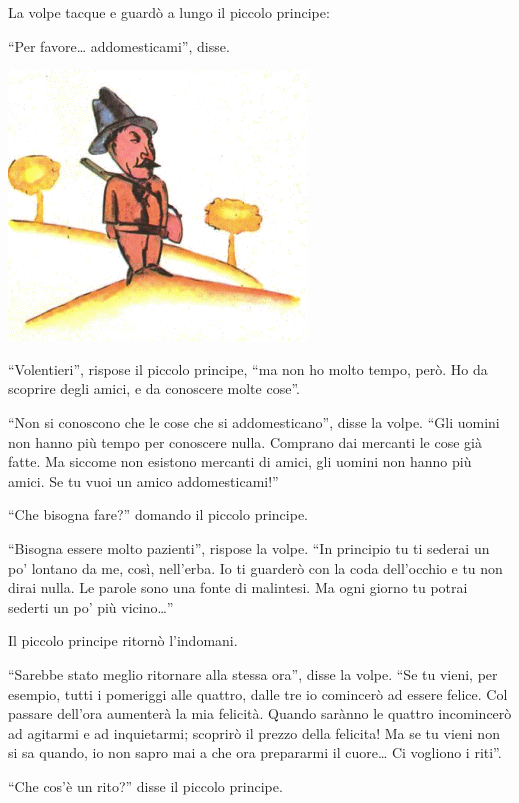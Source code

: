 \documentclass[11pt]{scrbook}
\begin{document}
La volpe tacque e guardò a lungo il piccolo principe:

``Per favore\ldots{} addomesticami'', disse.

\begin{center}
\includegraphics{img/myslivec}
\end{center}

``Volentieri'', rispose il piccolo principe, ``ma non ho molto tempo, però. Ho da scoprire degli amici, e da conoscere molte cose''.

``Non si conoscono che le cose che si addomesticano'', disse la volpe. ``Gli uomini non hanno più tempo per conoscere nulla. Comprano dai mercanti le cose già fatte. Ma siccome non esistono mercanti di amici, gli uomini non hanno più amici. Se tu vuoi un amico addomesticami!''

``Che bisogna fare?'' domando il piccolo principe.

``Bisogna essere molto pazienti'', rispose la volpe. ``In principio tu ti sederai un po' lontano da me, così, nell'erba. Io ti guarderò con la coda dell'occhio e tu non dirai nulla. Le parole sono una fonte di malintesi. Ma ogni giorno tu potrai sederti un po' più vicino\ldots{}''

Il piccolo principe ritornò l'indomani.

``Sarebbe stato meglio ritornare alla stessa ora'', disse la volpe. ``Se tu vieni, per esempio, tutti i pomeriggi alle quattro, dalle tre io comincerò ad essere felice. Col passare dell'ora aumenterà la mia felicità. Quando sarànno le quattro incomincerò ad agitarmi e ad inquietarmi; scoprirò il prezzo della felicita! Ma se tu vieni non si sa quando, io non sapro mai a che ora prepararmi il cuore\ldots{} Ci vogliono i riti''.

``Che cos'è un rito?'' disse il piccolo principe.
\end{document}
